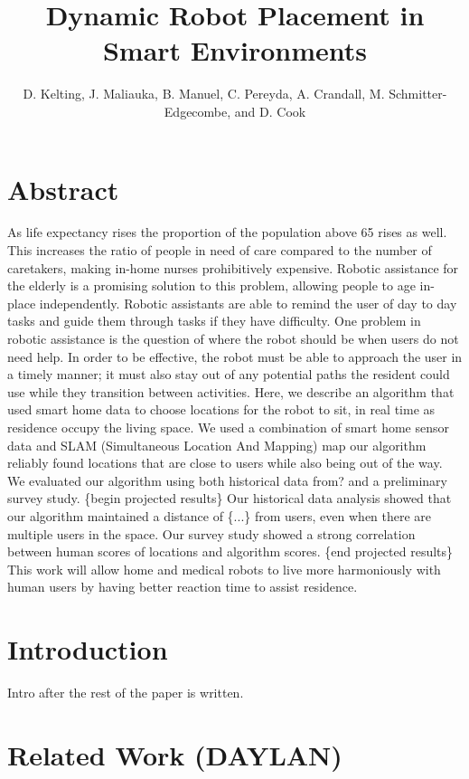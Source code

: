\documentclass[11pt, draft, a4paper]{IEEEtran}
\author{D. Kelting, J. Maliauka, B. Manuel, C. Pereyda, A. Crandall, M. Schmitter-Edgecombe, and D. Cook}
\title{Dynamic Robot Placement in Smart Environments}
\begin{document}
\maketitle


\section{Abstract}
As life expectancy rises the proportion of the population above 65 rises as well.
This increases the ratio of people in need of care compared to the number of
caretakers, making in-home nurses prohibitively expensive. \cite{UNProspects2017}
Robotic assistance for the elderly is a promising solution to this problem, 
allowing people to age in-place independently. Robotic assistants are able to 
remind the user of day to day tasks and guide them through tasks if they have 
difficulty. \cite{RAS_Paper} One problem in robotic assistance is the question of where the 
robot should be when users do not need help. In order to be effective, the 
robot must be able to approach the user in a timely manner; it must also stay 
out of any potential paths the resident could use while they transition between 
activities. Here, we describe an algorithm that used smart home data to choose 
locations for the robot to sit, in real time as residence occupy the living 
space. We used a combination of smart home sensor data and SLAM (Simultaneous 
Location And Mapping) map our algorithm reliably found locations that are close 
to users while also being out of the way. We evaluated our algorithm using both 
historical data {from?} and a preliminary survey study. \{begin projected 
results\} Our historical data analysis showed that our algorithm maintained a 
distance of \{...\} from users, even when there are multiple users in the 
space. Our survey study showed a strong correlation between human scores of 
locations and algorithm scores. \{end projected results\} This work will allow 
home and medical robots to live more harmoniously with human users by having 
better reaction time to assist residence. 


\section{Introduction}
Intro after the rest of the paper is written. 

\section{Related Work (DAYLAN)}
\end{document}
